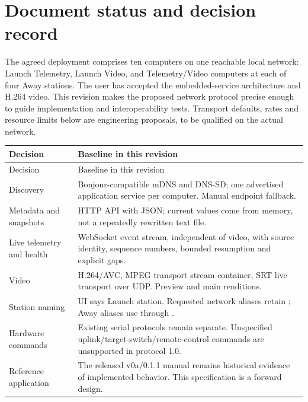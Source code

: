 \section*{Document status and decision record}

The agreed deployment comprises ten computers on one reachable local network:
Launch Telemetry, Launch Video, and Telemetry/Video computers at each of four
Away stations. The user has accepted the embedded-service architecture and H.264
video. This revision makes the proposed network protocol precise enough to guide
implementation and interoperability tests. Transport defaults, rates and resource
limits below are engineering proposals, to be qualified on the actual network.

\begin{longtable}{L{35mm}L{126mm}}
\toprule Decision & Baseline in this revision\\\midrule
\endfirsthead
\toprule Decision & Baseline in this revision\\\midrule
\endhead
Discovery & Bonjour-compatible mDNS and DNS-SD; one advertised application service per computer. Manual endpoint fallback.\\
Metadata and snapshots & HTTP API with JSON; current values come from memory, not a repeatedly rewritten text file.\\
Live telemetry and health & WebSocket event stream, independent of video, with source identity, sequence numbers, bounded resumption and explicit gaps.\\
Video & H.264/AVC, MPEG transport stream container, SRT live transport over UDP. Preview and main renditions.\\
Station naming & UI says Launch station. Requested network aliases retain ; Away aliases use  through .\\
Hardware commands & Existing serial protocols remain separate. Unspecified uplink/target-switch/remote-control commands are unsupported in protocol 1.0.\\
Reference application & The released v0a/0.1.1 manual remains historical evidence of implemented behavior. This specification is a forward design.\\
\bottomrule
\end{longtable}

